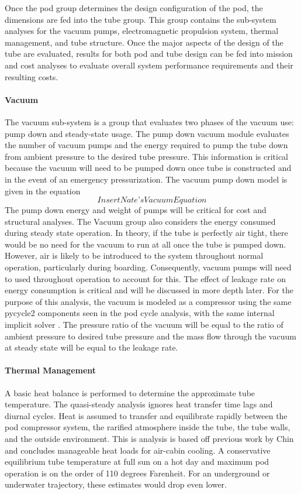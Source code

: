 	Once the pod group determines the design configuration of the pod, the
	dimensions are fed into the tube group. This group contains the sub-system
	analyses for the vacuum pumps, electromagnetic propulsion system, thermal
	management, and tube structure. Once the major aspects of the design of the
	tube are evaluated, results for both pod and tube design can be fed into
	mission and cost analyses to evaluate overall system performance
	requirements and their resulting costs.

\paragraph{Vacuum}
	The vacuum sub-system is a group that evaluates two phases of the vacuum
	use: pump down and steady-state usage. The pump down vacuum module
	evaluates the number of vacuum pumps and the energy required to pump the
	tube down from ambient pressure to the desired tube pressure.
	This information is critical because the vacuum will need to be pumped down
	once tube is constructed and in the event of an emergency pressurization.
	The vacuum pump down model is given in the equation
	\begin{equation}
		\label{eq:vacuum}
		Insert Nate’s Vacuum Equation
	\end{equation}
	The pump down energy and weight of pumps will be critical for cost and structural analyses.
	The Vacuum group also considers the energy consumed during steady state operation.
	In theory, if the tube is perfectly air tight, there would be no need for
	the vacuum to run at all once the tube is pumped down. However, air is likely to be introduced
	to the system throughout normal operation, particularly during boarding. Consequently,
	vacuum pumps will need to used throughout operation to account for this.
	The effect of leakage rate on energy consumption is critical and will be
	discussed in more depth later. For the purpose of this analysis, the vacuum
	is modeled as a compressor using the same pycycle2 components seen in the
	pod cycle analysis, with the same internal implicit solver \cite{pycycle2}.
	The pressure ratio of the vacuum will be equal to the ratio of ambient
	pressure to desired tube pressure and the mass flow through the vacuum at
	steady state will be equal to the leakage rate.
\paragraph{Thermal Management}
	A basic heat balance is performed to determine the approximate tube temperature.
	The quasi-steady analysis ignores heat transfer time lags and diurnal cycles.
	Heat is assumed to transfer and equilibrate rapidly between the pod compressor system,
	the rarified atmosphere inside the tube, the tube walls, and the outside environment.
	This is analysis is based off previous work by Chin\cite{Chin} and concludes
	manageable heat loads for air-cabin cooling. A conservative equilibrium
	tube temperature at full sun on a hot day and maximum pod operation is on
	the order of 110 degrees Farenheit.
	For an underground or underwater trajectory, these estimates would drop even lower.
